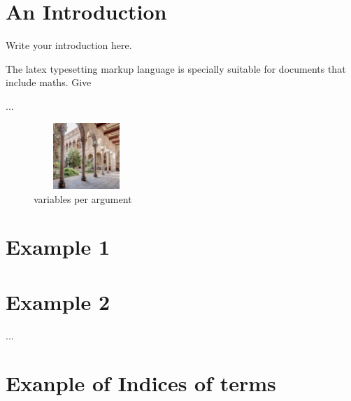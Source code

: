 \documentclass[a4paper, 12pt, oneside, times, print, NoDraft]{template/UBtemplate}
\begin{document}






















\section{An Introduction}


Write your introduction here.


 
 
 The \Gls{latex} typesetting markup language is specially suitable 
for documents that include \gls{maths}. Give
 

...

\begin{figure}[H]
    \centering
    \includegraphics[width=4cm, height=2.5cm]{images/edifici-historic-universitat-de-barcelona.jpg}
    \caption{variables per argument}
    \label{taula}
\end{figure}%

\section{Example 1}


\section{Example 2}

...

\section{Exanple of Indices of terms}
\end{document}
